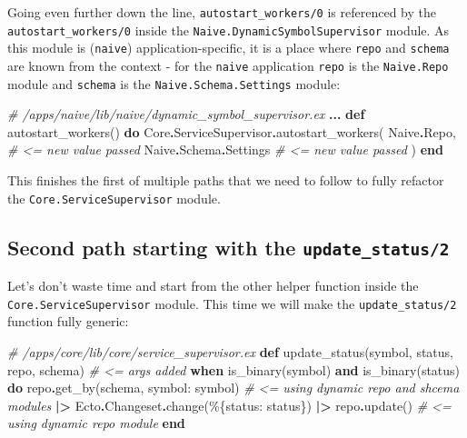 \documentclass[
  oneside]{book}
\newenvironment{Shaded}{\begin{snugshade}}{\end{snugshade}}
\newcommand{\CommentTok}[1]{\textcolor[rgb]{0.56,0.35,0.01}{\textit{#1}}}
\newcommand{\ConstantTok}[1]{\textcolor[rgb]{0.00,0.00,0.00}{#1}}
\newcommand{\KeywordTok}[1]{\textcolor[rgb]{0.13,0.29,0.53}{\textbf{#1}}}
\newcommand{\NormalTok}[1]{#1}
\newcommand{\OperatorTok}[1]{\textcolor[rgb]{0.81,0.36,0.00}{\textbf{#1}}}
\newcommand{\VariableTok}[1]{\textcolor[rgb]{0.00,0.00,0.00}{#1}}
\begin{document}
Going even further down the line, \texttt{autostart\_workers/0} is referenced by the \texttt{autostart\_workers/0} inside the \texttt{Naive.DynamicSymbolSupervisor} module. As this module is (\texttt{naive}) application-specific, it is a place where \texttt{repo} and \texttt{schema} are known from the context - for the \texttt{naive} application \texttt{repo} is the \texttt{Naive.Repo} module and \texttt{schema} is the \texttt{Naive.Schema.Settings} module:

\begin{Shaded}
\begin{Highlighting}[]
  \CommentTok{\# /apps/naive/lib/naive/dynamic\_symbol\_supervisor.ex}
  \OperatorTok{...}
  \KeywordTok{def}\NormalTok{ autostart\_workers() }\KeywordTok{do}
    \ConstantTok{Core}\OperatorTok{.}\ConstantTok{ServiceSupervisor}\OperatorTok{.}\NormalTok{autostart\_workers(}
      \ConstantTok{Naive}\OperatorTok{.}\ConstantTok{Repo}\NormalTok{,           }\CommentTok{\# \textless{}= new value passed}
      \ConstantTok{Naive}\OperatorTok{.}\ConstantTok{Schema}\OperatorTok{.}\ConstantTok{Settings} \CommentTok{\# \textless{}= new value passed}
\NormalTok{    )}
  \KeywordTok{end}
\end{Highlighting}
\end{Shaded}

This finishes the first of multiple paths that we need to follow to fully refactor the \texttt{Core.ServiceSupervisor} module.

\hypertarget{second-path-starting-with-the-update_status2}{%
\subsection{\texorpdfstring{Second path starting with the \texttt{update\_status/2}}{Second path starting with the update\_status/2}}\label{second-path-starting-with-the-update_status2}}

Let's don't waste time and start from the other helper function inside the \texttt{Core.ServiceSupervisor} module. This time we will make the \texttt{update\_status/2} function fully generic:

\begin{Shaded}
\begin{Highlighting}[]
  \CommentTok{\# /apps/core/lib/core/service\_supervisor.ex}
  \KeywordTok{def}\NormalTok{ update\_status(symbol, status, repo, schema) }\CommentTok{\# \textless{}= args added}
      \KeywordTok{when}\NormalTok{ is\_binary(symbol) }\KeywordTok{and}\NormalTok{ is\_binary(status) }\KeywordTok{do}
\NormalTok{    repo}\OperatorTok{.}\NormalTok{get\_by(schema, }\VariableTok{symbol:}\NormalTok{ symbol) }\CommentTok{\# \textless{}= using dynamic repo and shcema modules}
    \OperatorTok{|\textgreater{}} \ConstantTok{Ecto}\OperatorTok{.}\ConstantTok{Changeset}\OperatorTok{.}\NormalTok{change(\%\{}\VariableTok{status:}\NormalTok{ status\})}
    \OperatorTok{|\textgreater{}}\NormalTok{ repo}\OperatorTok{.}\NormalTok{update() }\CommentTok{\# \textless{}= using dynamic repo module}
  \KeywordTok{end}
\end{Highlighting}
\end{Shaded}
\end{document}
